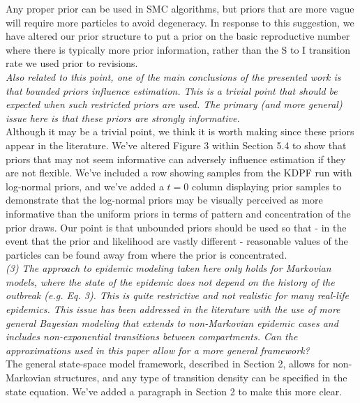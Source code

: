 \documentclass{article}
\begin{document}
Any proper prior can be used in SMC algorithms, but priors that are more vague will require more particles to avoid degeneracy. In response to this suggestion, we have altered our prior structure to put a prior on the basic reproductive number where there is typically more prior information, rather than the S to I transition rate we used prior to revisions. \\


\noindent \emph{Also related to this point, one of the main conclusions of the presented work is that bounded priors influence estimation. This is a trivial point that should be expected when such restricted priors are used. The primary (and more general) issue here is that these priors are strongly informative.} \\

Although it may be a trivial point, we think it is worth making since these priors appear in the literature. We've altered Figure 3 within Section 5.4 to show that priors that may not seem informative can adversely influence estimation if they are not flexible. We've included a row showing samples from the KDPF run with log-normal priors, and we've added a $t = 0$ column displaying prior samples to demonstrate that the log-normal priors may be visually perceived as more informative than the uniform priors in terms of pattern and concentration of the prior draws. Our point is that unbounded priors should be used so that - in the event that the prior and likelihood are vastly different - reasonable values of the particles can be found away from where the prior is concentrated. \\

\noindent \emph{(3) The approach to epidemic modeling taken here only holds for Markovian models, where the state of the epidemic does not depend on the history of the outbreak (e.g. Eq. 3). This is quite restrictive and not realistic for many real-life epidemics. This issue has been addressed in the literature with the use of more general Bayesian modeling that extends to non-Markovian epidemic cases and includes non-exponential transitions between compartments. Can the approximations used in this paper allow for a more general framework?} \\

The general state-space model framework, described in Section 2, allows for non-Markovian structures, and any type of transition density can be specified in the state equation. We've added a paragraph in Section 2 to make this more clear. \\
\end{document}
